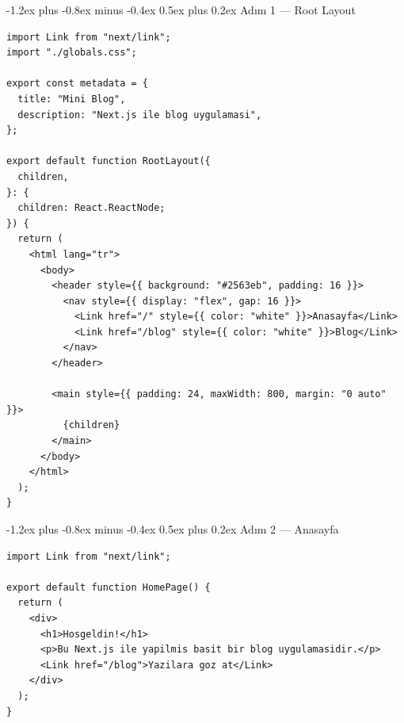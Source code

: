 \documentclass[12pt, a4paper]{article}
\makeatletter
\renewcommand{\subsection}{%
  \@startsection{subsection}{2}{\z@}%
    {-1.2ex plus -0.8ex minus -0.4ex}%
    {0.5ex plus 0.2ex}%
    {\normalfont\large\bfseries\sffamily\color{secondary}}%
}
\makeatother
\begin{document}
\vspace{8pt}

\subsection{Adım 1 --- Root Layout}

\begin{tcolorbox}[enhanced, colback=codebg, colframe=gray!30,
    colbacktitle=primary!85!black, coltitle=white, arc=4pt,
    title={\sffamily\bfseries\small src/app/layout.tsx}]
\begin{lstlisting}[style=jsxstyle]
import Link from "next/link";
import "./globals.css";

export const metadata = {
  title: "Mini Blog",
  description: "Next.js ile blog uygulamasi",
};

export default function RootLayout({
  children,
}: {
  children: React.ReactNode;
}) {
  return (
    <html lang="tr">
      <body>
        <header style={{ background: "#2563eb", padding: 16 }}>
          <nav style={{ display: "flex", gap: 16 }}>
            <Link href="/" style={{ color: "white" }}>Anasayfa</Link>
            <Link href="/blog" style={{ color: "white" }}>Blog</Link>
          </nav>
        </header>

        <main style={{ padding: 24, maxWidth: 800, margin: "0 auto" }}>
          {children}
        </main>
      </body>
    </html>
  );
}
\end{lstlisting}
\end{tcolorbox}

\subsection{Adım 2 --- Anasayfa}

\begin{tcolorbox}[enhanced, colback=codebg, colframe=gray!30,
    colbacktitle=primary!85!black, coltitle=white, arc=4pt,
    title={\sffamily\bfseries\small src/app/page.tsx}]
\begin{lstlisting}[style=jsxstyle]
import Link from "next/link";

export default function HomePage() {
  return (
    <div>
      <h1>Hosgeldin!</h1>
      <p>Bu Next.js ile yapilmis basit bir blog uygulamasidir.</p>
      <Link href="/blog">Yazilara goz at</Link>
    </div>
  );
}
\end{lstlisting}
\end{tcolorbox}

\newpage
\end{document}
